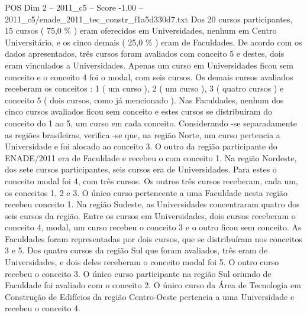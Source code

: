 \begin{textsample}{POS Dim 2 – 2011\_c5 – Score -1.00 – 2011\_c5/enade\_2011\_tec\_constr\_f1a5d330d7.txt}
Dos 20 cursos participantes, 15 cursos ( 75,0 \% ) eram oferecidos em Universidades, nenhum em Centro Universitário, e os cinco demais ( 25,0 \% ) eram de Faculdades.
De acordo com os dados apresentados, três cursos foram avaliados com conceito 5 e destes, dois eram vinculados a Universidades.
Apenas um curso em Universidades ficou sem conceito e o conceito 4 foi o modal, com seis cursos.
Os demais cursos avaliados receberam os conceitos : 1 ( um curso ), 2 ( um curso ), 3 ( quatro cursos ) e conceito 5 ( dois cursos, como já mencionado ).
Nas Faculdades, nenhum dos cinco cursos avaliados ficou sem conceito e estes cursos se distribuíram do conceito do 1 ao 5, um curso em cada conceito.
Considerando -se separadamente as regiões brasileiras, verifica -se que, na região Norte, um curso pertencia a Universidade e foi alocado ao conceito 3.
O outro da região participante do ENADE/2011 era de Faculdade e recebeu o com conceito 1.
Na região Nordeste, dos sete cursos participantes, seis cursos era de Universidades.
Para estes o conceito modal foi 4, com três cursos.
Os outros três cursos receberam, cada um, os conceitos 1, 2 e 3.
O único curso pertencente a uma Faculdade nesta região recebeu conceito 1.
Na região Sudeste, as Universidades concentraram quatro dos seis cursos da região.
Entre os cursos em Universidades, dois cursos receberam o conceito 4, modal, um curso recebeu o conceito 3 e o outro ficou sem conceito.
As Faculdades foram representadas por dois cursos, que se distribuíram nos conceitos 3 e 5.
Dos quatro cursos da região Sul que foram avaliados, três eram de Universidades, e dois deles receberam o conceito modal foi 5.
O outro curso recebeu o conceito 3.
O único curso participante na região Sul oriundo de Faculdade foi avaliado com o conceito 2.
O único curso da Área de Tecnologia em Construção de Edifícios da região Centro-Oeste pertencia a uma Universidade e recebeu o conceito 4.

\end{textsample}
